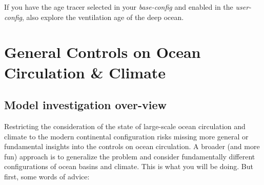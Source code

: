 If you have the age tracer selected in your \textit{base-config} and enabled in the \textit{user-config}, also explore the ventilation age of the deep ocean.

\newpage
%
\section{General Controls on Ocean Circulation \& Climate}


\subsection{Model investigation over-view}

Restricting the consideration of the state of large-scale ocean circulation and climate to the modern continental configuration risks missing more general or fundamental insights into the controls on ocean circulation. A broader (and more fun) approach is to generalize the problem and consider fundamentally different configurations of ocean basins and climate. This is what you will be doing. But first, some words of advice:

